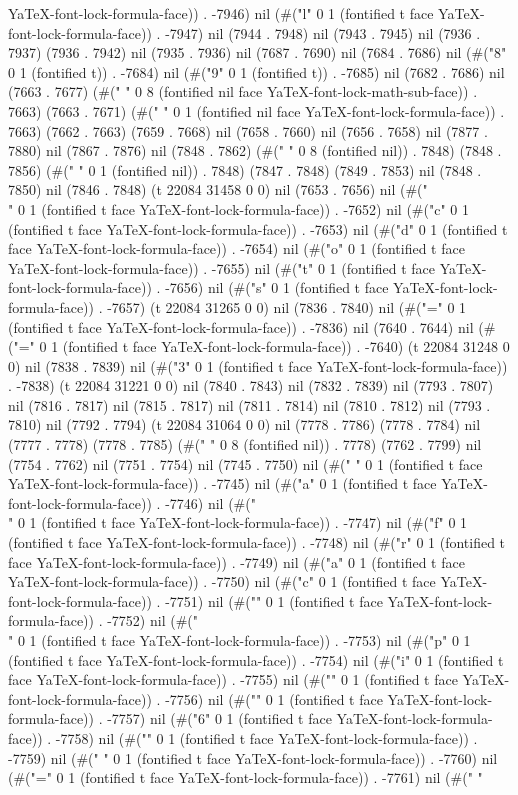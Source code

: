 YaTeX-font-lock-formula-face)) . -7946) nil (#("l" 0 1 (fontified t face YaTeX-font-lock-formula-face)) . -7947) nil (7944 . 7948) nil (7943 . 7945) nil (7936 . 7937) (7936 . 7942) nil (7935 . 7936) nil (7687 . 7690) nil (7684 . 7686) nil (#("8" 0 1 (fontified t)) . -7684) nil (#("9" 0 1 (fontified t)) . -7685) nil (7682 . 7686) nil (7663 . 7677) (#("        " 0 8 (fontified nil face YaTeX-font-lock-math-sub-face)) . 7663) (7663 . 7671) (#(" " 0 1 (fontified nil face YaTeX-font-lock-formula-face)) . 7663) (7662 . 7663) (7659 . 7668) nil (7658 . 7660) nil (7656 . 7658) nil (7877 . 7880) nil (7867 . 7876) nil (7848 . 7862) (#("        " 0 8 (fontified nil)) . 7848) (7848 . 7856) (#(" " 0 1 (fontified nil)) . 7848) (7847 . 7848) (7849 . 7853) nil (7848 . 7850) nil (7846 . 7848) (t 22084 31458 0 0) nil (7653 . 7656) nil (#("\\" 0 1 (fontified t face YaTeX-font-lock-formula-face)) . -7652) nil (#("c" 0 1 (fontified t face YaTeX-font-lock-formula-face)) . -7653) nil (#("d" 0 1 (fontified t face YaTeX-font-lock-formula-face)) . -7654) nil (#("o" 0 1 (fontified t face YaTeX-font-lock-formula-face)) . -7655) nil (#("t" 0 1 (fontified t face YaTeX-font-lock-formula-face)) . -7656) nil (#("s" 0 1 (fontified t face YaTeX-font-lock-formula-face)) . -7657) (t 22084 31265 0 0) nil (7836 . 7840) nil (#("=" 0 1 (fontified t face YaTeX-font-lock-formula-face)) . -7836) nil (7640 . 7644) nil (#("=" 0 1 (fontified t face YaTeX-font-lock-formula-face)) . -7640) (t 22084 31248 0 0) nil (7838 . 7839) nil (#("3" 0 1 (fontified t face YaTeX-font-lock-formula-face)) . -7838) (t 22084 31221 0 0) nil (7840 . 7843) nil (7832 . 7839) nil (7793 . 7807) nil (7816 . 7817) nil (7815 . 7817) nil (7811 . 7814) nil (7810 . 7812) nil (7793 . 7810) nil (7792 . 7794) (t 22084 31064 0 0) nil (7778 . 7786) (7778 . 7784) nil (7777 . 7778) (7778 . 7785) (#("        " 0 8 (fontified nil)) . 7778) (7762 . 7799) nil (7754 . 7762) nil (7751 . 7754) nil (7745 . 7750) nil (#(" " 0 1 (fontified t face YaTeX-font-lock-formula-face)) . -7745) nil (#("a" 0 1 (fontified t face YaTeX-font-lock-formula-face)) . -7746) nil (#("\\" 0 1 (fontified t face YaTeX-font-lock-formula-face)) . -7747) nil (#("f" 0 1 (fontified t face YaTeX-font-lock-formula-face)) . -7748) nil (#("r" 0 1 (fontified t face YaTeX-font-lock-formula-face)) . -7749) nil (#("a" 0 1 (fontified t face YaTeX-font-lock-formula-face)) . -7750) nil (#("c" 0 1 (fontified t face YaTeX-font-lock-formula-face)) . -7751) nil (#("{" 0 1 (fontified t face YaTeX-font-lock-formula-face)) . -7752) nil (#("\\" 0 1 (fontified t face YaTeX-font-lock-formula-face)) . -7753) nil (#("p" 0 1 (fontified t face YaTeX-font-lock-formula-face)) . -7754) nil (#("i" 0 1 (fontified t face YaTeX-font-lock-formula-face)) . -7755) nil (#("}" 0 1 (fontified t face YaTeX-font-lock-formula-face)) . -7756) nil (#("{" 0 1 (fontified t face YaTeX-font-lock-formula-face)) . -7757) nil (#("6" 0 1 (fontified t face YaTeX-font-lock-formula-face)) . -7758) nil (#("}" 0 1 (fontified t face YaTeX-font-lock-formula-face)) . -7759) nil (#(" " 0 1 (fontified t face YaTeX-font-lock-formula-face)) . -7760) nil (#("=" 0 1 (fontified t face YaTeX-font-lock-formula-face)) . -7761) nil (#(" " 